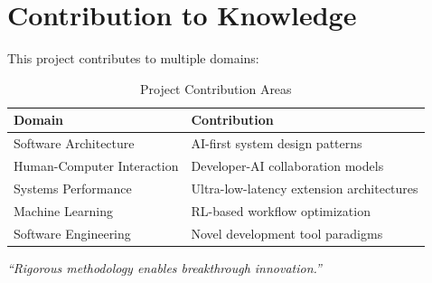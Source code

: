 \section*{Contribution to Knowledge}

This project contributes to multiple domains:

\begin{table}[ht]
\centering
\begin{tabular}{@{}ll@{}}
\toprule
\textbf{Domain} & \textbf{Contribution} \\
\midrule
Software Architecture & AI-first system design patterns \\
Human-Computer Interaction & Developer-AI collaboration models \\
Systems Performance & Ultra-low-latency extension architectures \\
Machine Learning & RL-based workflow optimization \\
Software Engineering & Novel development tool paradigms \\
\bottomrule
\end{tabular}
\caption{Project Contribution Areas}
\end{table}

\vspace{0.5cm}
\begin{center}
\textit{``Rigorous methodology enables breakthrough innovation.''}
\end{center}

\clearpage
